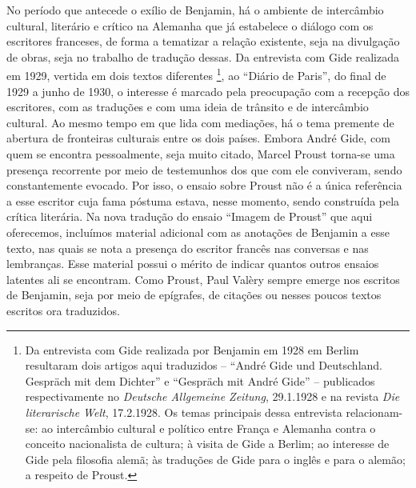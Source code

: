 No período que antecede o exílio de Benjamin, há o ambiente de
intercâmbio cultural, literário e crítico na Alemanha que já estabelece
o diálogo com os escritores franceses, de forma a tematizar a relação
existente, seja na divulgação de obras, seja no trabalho de tradução
dessas. Da entrevista com Gide realizada em 1929, vertida em dois textos
diferentes \footnote{Da entrevista com Gide realizada por Benjamin em
  1928 em Berlim resultaram dois artigos aqui traduzidos -- ``André Gide
  und Deutschland. Gespräch mit dem Dichter'' e ``Gespräch mit André
  Gide'' -- publicados respectivamente no \emph{Deutsche Allgemeine
  Zeitung}, 29.1.1928 e na revista \emph{Die literarische Welt},
  17.2.1928. Os temas principais dessa entrevista relacionam-se: ao
  intercâmbio cultural e político entre França e Alemanha contra o
  conceito nacionalista de cultura; à visita de Gide a Berlim; ao
  interesse de Gide pela filosofia alemã; às traduções de Gide para o
  inglês e para o alemão; a respeito de Proust.}, ao ``Diário de
Paris'', do final de 1929 a junho de 1930, o interesse é marcado pela
preocupação com a recepção dos escritores, com as traduções e com uma
ideia de trânsito e de intercâmbio cultural. Ao mesmo tempo em que lida
com mediações, há o tema premente de abertura de fronteiras culturais
entre os dois países. Embora André Gide, com quem se encontra
pessoalmente, seja muito citado, Marcel Proust torna-se uma presença
recorrente por meio de testemunhos dos que com ele conviveram, sendo
constantemente evocado. Por isso, o ensaio sobre Proust não é a única
referência a esse escritor cuja fama póstuma estava, nesse momento,
sendo construída pela crítica literária. Na nova tradução do ensaio
``Imagem de Proust'' que aqui oferecemos, incluímos material adicional
com as anotações de Benjamin a esse texto, nas quais se nota a presença
do escritor francês nas conversas e nas lembranças. Esse material possui
o mérito de indicar quantos outros ensaios latentes ali se encontram.
Como Proust, Paul Valèry sempre emerge nos escritos de Benjamin, seja
por meio de epígrafes, de citações ou nesses poucos textos escritos ora
traduzidos.


